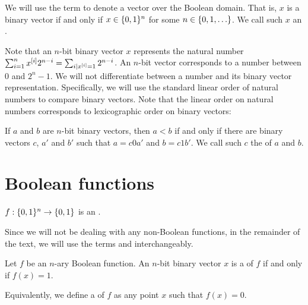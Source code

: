\begin{definition}
We will use the term 
to denote a vector over the Boolean domain.
That is, $x$ is a binary vector if and only if
$x \in \{0, 1\}^n$ for some $n \in \{0, 1, \ldots\}$.
We call such $x$ an .
\end{definition}

Note that an $n$-bit binary vector $x$
represents the natural number
$\sum_{i = 1}^n x^{[i]} 2^{n-i}
= \sum_{i|x^{[i]}=1} 2^{n-i}$.
An $n$-bit vector
corresponds to a number between $0$ and $2^n - 1$.
We will not differentiate between a number
and its binary vector representation.
Specifically,
we will use the standard linear order of natural numbers
to compare binary vectors.
Note that the linear order on natural numbers
corresponds to lexicographic order
on binary vectors:
\begin{observation}
\label{observation:lexicographicorder}
If $a$ and $b$ are $n$-bit binary vectors,
then $a < b$
if and only if
there are binary vectors $c$,
$a'$ and $b'$
such that
$a = c 0 a'$ and $b = c 1 b'$.
We call such $c$ the 
of $a$ and $b$.
\end{observation}

\section{Boolean functions}

\begin{definition}
$f: \{0, 1\}^n \rightarrow \{0, 1\}$ is
an .
\end{definition}

Since we will not be dealing with any non-Boolean functions,
in the remainder of the text,
we will use the terms
 and 
interchangeably.

\begin{definition}
Let $f$ be an $n$-ary Boolean function.
An $n$-bit binary vector $x$ is a 
of $f$ if and only if $f(x)  = 1$.
\end{definition}

Equivalently,
we define a  of $f$
as any point $x$
such that $f(x) = 0$.


